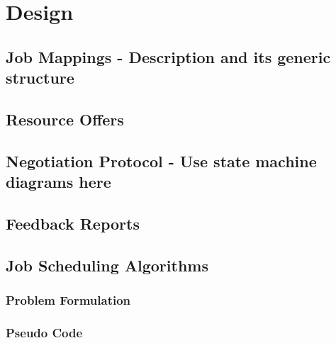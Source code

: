 \chapter{Design}
\label{chapter:ischeduler}
\section{Job Mappings - Description and its generic structure}
\section{Resource Offers}
\section{Negotiation Protocol - Use state machine diagrams here}
\section{Feedback Reports}
\section{Job Scheduling Algorithms}
\subsection{Problem Formulation}
\subsection{Pseudo Code}

